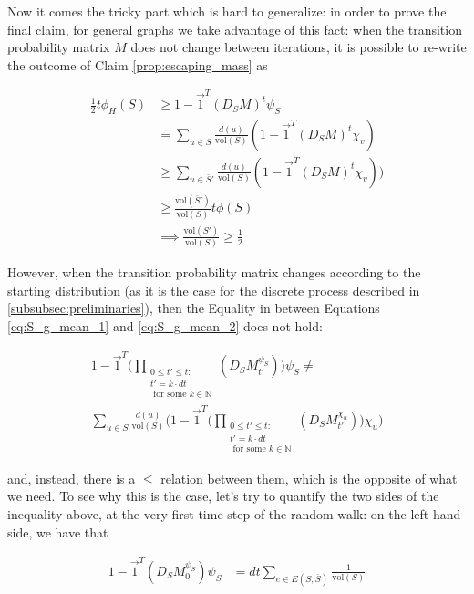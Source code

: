 \documentclass[../main.tex]{subfiles}
\begin{document}
    Now it comes the tricky part which is hard to generalize: in order to prove the final claim, for general graphs we take advantage of this fact: when the transition probability matrix $M$ does not change between iterations, it is possible to re-write the outcome of Claim \ref{prop:escaping_mass} as
    
    \begin{align}
        \frac{1}{2} t \phi_H(S) & \geq 1 - \vec{1}^T\left(D_S M\right)^t \psi_S \label{eq:S_g_mean_1}\\
        & = \sum_{u\in S}\frac{d(u)}{\text{vol}(S)} \left(1 - \vec{1}^T\left(D_S M\right)^t\chi_v\right) \label{eq:S_g_mean_2} \\
        & \geq \sum_{u\in \bar{S}'} \frac{d(u)}{\text{vol}(S)} (1 - \vec{1}^T(D_S M)^t \chi_v)) \\
        &\geq \frac{\text{vol}(\bar{S}')}{\text{vol}(S)} t \phi(S) \\
        &\implies \frac{\text{vol}(S')}{\text{vol}(S)} \geq \frac{1}{2}
    \end{align}
    
    However, when the transition probability matrix changes according to the starting distribution (as it is the case for the discrete process described in \ref{subsubsec:preliminaries}), then the Equality in between Equations \ref{eq:S_g_mean_1} and \ref{eq:S_g_mean_2} does not hold:
    
    \begin{multline}
        1 - \vec{1}^T\bigg(\prod_{\substack{0 \leq t'\leq t:\\ t' = k\cdot dt\\ \text{ for some }k\in \mathbb{N}}} (D_S M_{t'}^{\psi_S})\bigg) \psi_S \neq \\ \sum_{u\in S}\frac{d(u)}{\text{vol}(S)} \bigg(1 - \vec{1}^T\bigg(\prod_{\substack{0 \leq t'\leq t:\\ t' = k\cdot dt\\ \text{ for some }k\in \mathbb{N}}} (D_S M_{t'}^{\chi_u})\bigg)\chi_u\bigg)
    \end{multline}
    
    and, instead, there is a $\leq$ relation between them, which is the opposite of what we need. To see why this is the case, let's try to quantify the two sides of the inequality above, at the very first time step of the random walk: on the left hand side, we have that 
    
    \begin{align}
        1 - \vec{1}^T\left(D_S M_0^{\psi_S}\right)\psi_S &=
        dt \sum_{e\in E(S, \bar{S})} \frac{1}{\text{vol}(S)}
    \end{align}
    
\end{document}
